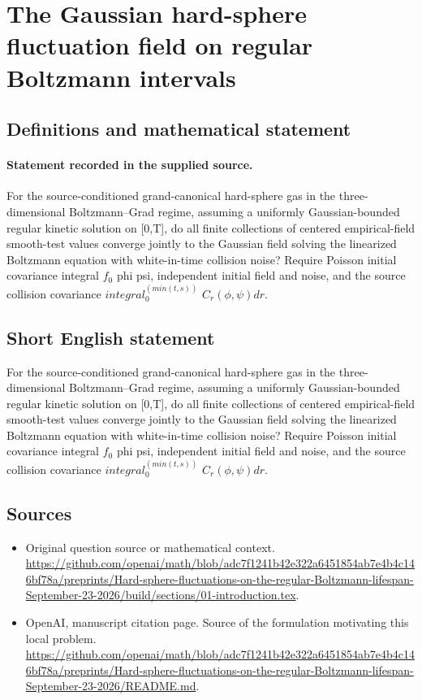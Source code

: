 \documentclass[11pt]{article}
\begin{document}
\section*{The Gaussian hard-sphere fluctuation field on regular Boltzmann intervals}\label{statement}
\subsection{Definitions and mathematical statement}
\paragraph{Statement recorded in the supplied source.}
For the source-conditioned grand-canonical hard-sphere gas in the three-dimensional Boltzmann–Grad regime, assuming a uniformly Gaussian-bounded regular kinetic solution on [0,T], do all finite collections of centered empirical-field smooth-test values converge jointly to the Gaussian field solving the linearized Boltzmann equation with white-in-time collision noise? Require Poisson initial covariance integral $f_0$ phi psi, independent initial field and noise, and the source collision covariance $integral_0^(min(t,s))$ $C_r(\phi ,\psi )dr$.
\subsection{Short English statement}
For the source-conditioned grand-canonical hard-sphere gas in the three-dimensional Boltzmann–Grad regime, assuming a uniformly Gaussian-bounded regular kinetic solution on [0,T], do all finite collections of centered empirical-field smooth-test values converge jointly to the Gaussian field solving the linearized Boltzmann equation with white-in-time collision noise? Require Poisson initial covariance integral $f_0$ phi psi, independent initial field and noise, and the source collision covariance $integral_0^(min(t,s))$ $C_r(\phi ,\psi )dr$.
\subsection{Sources}
\begin{itemize}
\item[S1] Original question source or mathematical context.
\url{https://github.com/openai/math/blob/adc7f1241b42e322a6451854ab7e4b4c146bf78a/preprints/Hard-sphere-fluctuations-on-the-regular-Boltzmann-lifespan-September-23-2026/build/sections/01-introduction.tex}.
\item[S2] OpenAI, manuscript citation page. Source of the formulation motivating this local problem.
\url{https://github.com/openai/math/blob/adc7f1241b42e322a6451854ab7e4b4c146bf78a/preprints/Hard-sphere-fluctuations-on-the-regular-Boltzmann-lifespan-September-23-2026/README.md}.
\end{itemize}
\end{document}
